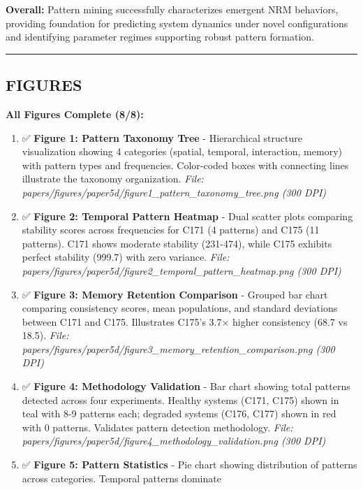 \documentclass[
]{article}
\begin{document}
\textbf{Overall:} Pattern mining successfully characterizes emergent NRM
behaviors, providing foundation for predicting system dynamics under
novel configurations and identifying parameter regimes supporting robust
pattern formation.

\begin{center}\rule{0.5\linewidth}{0.5pt}\end{center}

\subsection{FIGURES}\label{figures}

\textbf{All Figures Complete (8/8):}

\begin{enumerate}
\def\labelenumi{\arabic{enumi}.}
\item
  ✅ \textbf{Figure 1: Pattern Taxonomy Tree} - Hierarchical structure
  visualization showing 4 categories (spatial, temporal, interaction,
  memory) with pattern types and frequencies. Color-coded boxes with
  connecting lines illustrate the taxonomy organization. \emph{File:
  papers/figures/paper5d/figure1\_pattern\_taxonomy\_tree.png (300 DPI)}
\item
  ✅ \textbf{Figure 2: Temporal Pattern Heatmap} - Dual scatter plots
  comparing stability scores across frequencies for C171 (4 patterns)
  and C175 (11 patterns). C171 shows moderate stability (231-474), while
  C175 exhibits perfect stability (999.7) with zero variance.
  \emph{File:
  papers/figures/paper5d/figure2\_temporal\_pattern\_heatmap.png (300
  DPI)}
\item
  ✅ \textbf{Figure 3: Memory Retention Comparison} - Grouped bar chart
  comparing consistency scores, mean populations, and standard
  deviations between C171 and C175. Illustrates C175's 3.7× higher
  consistency (68.7 vs 18.5). \emph{File:
  papers/figures/paper5d/figure3\_memory\_retention\_comparison.png (300
  DPI)}
\item
  ✅ \textbf{Figure 4: Methodology Validation} - Bar chart showing total
  patterns detected across four experiments. Healthy systems (C171,
  C175) shown in teal with 8-9 patterns each; degraded systems (C176,
  C177) shown in red with 0 patterns. Validates pattern detection
  methodology. \emph{File:
  papers/figures/paper5d/figure4\_methodology\_validation.png (300 DPI)}
\item
  ✅ \textbf{Figure 5: Pattern Statistics} - Pie chart showing
  distribution of patterns across categories. Temporal patterns dominate

\end{enumerate}
\end{document}
